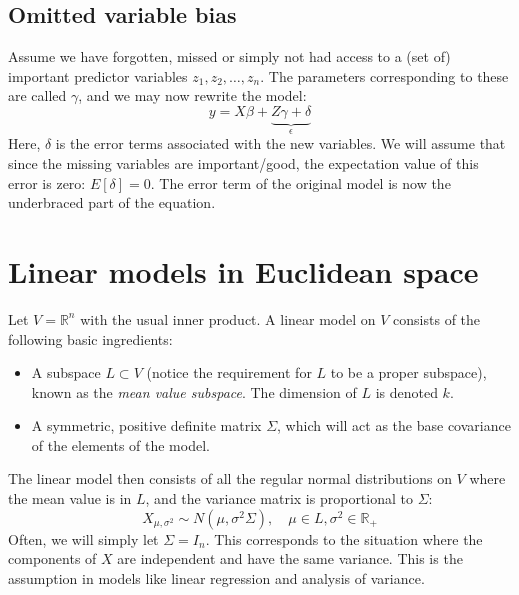 \documentclass[12pt, a4paper]{article}
\numberwithin{equation}{section}
\begin{document}
\subsection{Omitted variable bias}
Assume we have forgotten, missed or simply not had access to a (set of) important predictor variables $z_1, z_2,\ldots, z_n$. The parameters corresponding to these are called $\gamma$, and we may now rewrite the model:
\begin{equation}
y=X\beta+\underbrace{Z\gamma+\delta}_{\epsilon}
\end{equation}
Here, $\delta$ is the error terms associated with the new variables. We will assume that since the missing variables are important/good, the expectation value of this error is zero: $E[\delta]=0$. The error term of the original model is now the underbraced part of the equation.

\section{Linear models in Euclidean space}
Let $V=\mathbb{R}^n$ with the usual inner product. A linear model on $V$ consists of the following basic ingredients:
\begin{itemize}
\item A subspace $L\subset V$ (notice the requirement for $L$ to be a proper subspace), known as the \textit{mean value subspace}. The dimension of $L$ is denoted $k$.
\item A symmetric, positive definite matrix $\Sigma$, which will act as the base covariance of the elements of the model.
\end{itemize}
The linear model then consists of all the regular normal distributions on $V$ where the mean value is in $L$, and the variance matrix is proportional to $\Sigma$:
\begin{equation}
X_{\mu,\sigma^2}\sim N\left(\mu,\sigma^2\Sigma\right),\quad\mu\in L,\sigma^2\in\mathbb{R}_+
\end{equation}
Often, we will simply let $\Sigma=I_n$. This corresponds to the situation where the components of $X$ are independent and have the same variance. This is the assumption in models like linear regression and analysis of variance.
\end{document}
